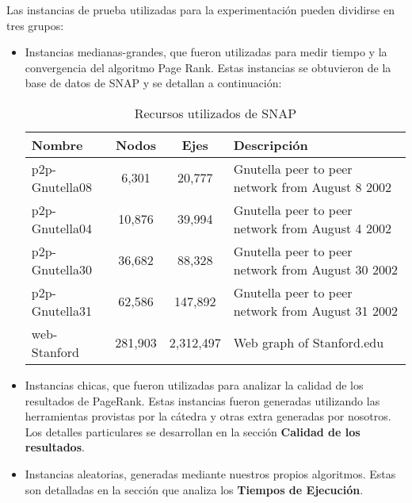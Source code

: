 Las instancias de prueba utilizadas para la experimentación pueden dividirse en tres grupos:
\begin{itemize}
    \item Instancias medianas-grandes, que fueron utilizadas para medir tiempo y la convergencia del algoritmo Page Rank.
        Estas instancias se obtuvieron de la base de datos de SNAP\cite{SNAP} y se detallan a continuación:

        \begin{table}[H]
            \begin{center}
                \begin{tabular}{| l | c | c | l |}
                    \hline
                    Nombre          &Nodos      &Ejes       & Descripción \\ \hline
                    p2p-Gnutella08 	&6,301  	&20,777 	& Gnutella peer to peer network from August 8 2002 \\
                    p2p-Gnutella04 	&10,876  	&39,994 	& Gnutella peer to peer network from August 4 2002 \\
                    p2p-Gnutella30 	&36,682  	&88,328 	& Gnutella peer to peer network from August 30 2002 \\
                    p2p-Gnutella31 	&62,586  	&147,892 	& Gnutella peer to peer network from August 31 2002 \\
                    web-Stanford 	&281,903  	&2,312,497 	& Web graph of Stanford.edu \\
                    \hline
                \end{tabular}
                \captionsetup{justification=centering}
                \caption{Recursos utilizados de SNAP}
                \label{recursos_snap}
            \end{center}
        \end{table}


    \item Instancias chicas, que fueron utilizadas para analizar la calidad de los resultados de PageRank.
        Estas instancias fueron generadas utilizando las herramientas provistas por la cátedra y otras extra generadas por nosotros.
        Los detalles particulares se desarrollan en la sección \textbf{Calidad de los resultados}.

    \item Instancias aleatorias, generadas mediante nuestros propios algoritmos. Estas son detalladas en la sección que analiza los \textbf{Tiempos de Ejecución}.
\end{itemize}

